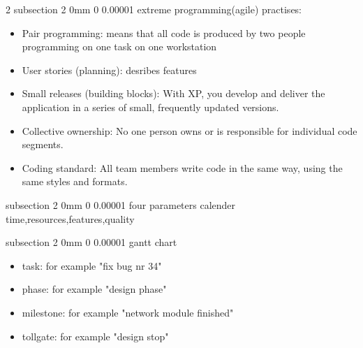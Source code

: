 \documentclass[a4paper,11pt]{article}
\makeatletter
\renewcommand{\subsection}{\@startsection
   {subsection}%
   {2}%
   {0mm}%
   {0\baselineskip}%
   {0.00001\baselineskip}%
   {\rmfamily\normalfont\slshape\normalsize}}%
\makeatother
\begin{document}
\begin{multicols}{2}
\subsection{extreme programming(agile)}
practises:
\vspace{0 mm}
\begin{itemize}
 \setlength\itemsep{0em}
\item Pair programming: means that all code is produced by two people programming on one task on one workstation
\item User stories (planning): desribes features
\item Small releases (building blocks): With XP, you develop and deliver the application in a series of small, frequently updated versions.
\item Collective ownership: No one person owns or is responsible for individual code segments.
\item Coding standard: All team members write code in the same way, using the same styles and formats.
\end{itemize}

\subsection{four parameters}
calender time,resources,features,quality

\subsection{gantt chart}
\vspace{0 mm}
\begin{itemize}
 \setlength\itemsep{0em}
\item task: for example "fix bug nr 34"
\item phase: for example "design phase"
\item milestone: for example "network module finished"
\item tollgate: for example "design stop"
\end{itemize}


\end{multicols}
\end{document}
